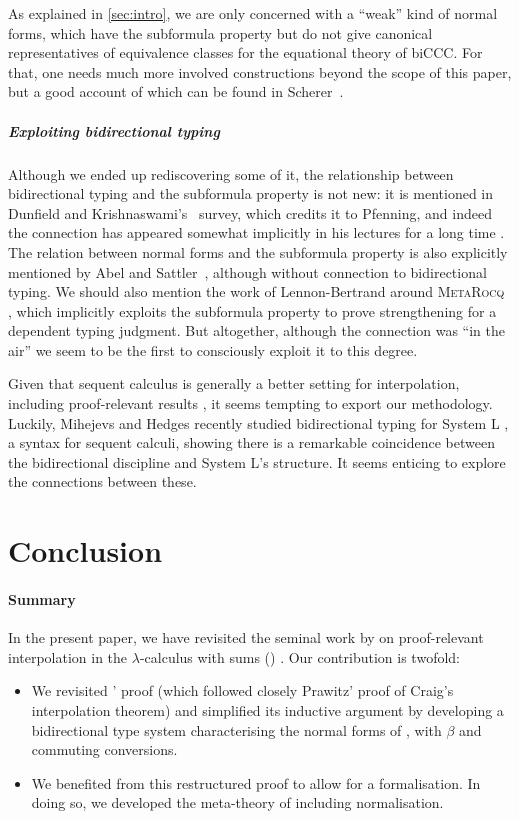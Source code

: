 \documentclass[a4paper,UKenglish,cleveref, autoref, thm-restate]{lipics-v2021}
\begin{document}
As explained in \cref{sec:intro}, we are only concerned with a ``weak''
kind of normal forms, which have the subformula property but do
not give canonical representatives of equivalence classes for the
equational theory of biCCC. For that, one needs much more involved
constructions beyond the scope of this paper, but a good
account of which can be found in Scherer~\cite{Scherer2017}.

\subparagraph*{Exploiting bidirectional typing}
Although we ended up rediscovering some of it,
the relationship between bidirectional typing and the subformula property
is not new: it is mentioned in Dunfield and
Krishnaswami's~\cite{Dunfield2021} survey, which credits it to Pfenning,
and indeed the connection has appeared somewhat implicitly in his lectures
for a long time \cite{Pfenning1999}.
The relation between normal forms and the subformula property is also
explicitly mentioned by Abel and Sattler~\cite{Abel2019a}, although without
connection to bidirectional typing. We should also mention the work of
Lennon-Bertrand around \textsc{MetaRocq}
\cite{LennonBertrand2021,MetaCoq2025}, which implicitly exploits the subformula
property to prove strengthening for a dependent typing judgment.
But altogether, although the connection was ``in the air''
we seem to be the first to consciously exploit it to this degree.

Given that sequent calculus is generally a better setting for interpolation,
including proof-relevant results \cite{Saurin25fscd}, it seems tempting to
export our methodology. Luckily, Mihejevs and Hedges \cite{Mihejevs2025}
recently studied bidirectional typing for System L \cite{MunchMaccagnoni2013,Curien2000},
a syntax for sequent calculi, showing there is a remarkable coincidence between
the bidirectional discipline and System L's structure.
It seems enticing to explore the connections between these.

\section{Conclusion}
\label{sec:conclusion}

\paragraph*{Summary}

In the present paper, we have revisited the seminal work by \Cubric
on proof-relevant interpolation in the $\lambda$-calculus with sums (\stlcp)
\cite{Cubric1994}. Our contribution is twofold:
\begin{itemize}
	\item We revisited \Cubric' proof (which followed closely Prawitz' proof of Craig's interpolation theorem) and simplified its inductive argument by developing a bidirectional type system characterising the normal forms of \stlcp, with  $\beta$ and commuting conversions. 
	\item We benefited from this restructured proof to allow for a \Rocq formalisation.
  In doing so, we developed the meta-theory of \stlcp including normalisation.
\end{itemize} 
\end{document}
